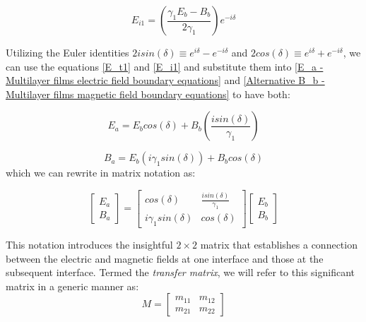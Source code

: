    \begin{equation} \label{E_i1}
    E_{i1} = \left(\frac{\gamma_1E_b - B_b}{2\gamma_1}\right)e^{-i\delta}
    \end{equation}

Utilizing the Euler identities $2isin(\delta) \equiv e^{i\delta} - e^{-i\delta}$ and $2cos(\delta) \equiv e^{i\delta} + e^{-i\delta}$, we can use the equations \ref{E_t1} and \ref{E_i1} and substitute them into \ref{E_a - Multilayer films electric field boundary equations} and \ref{Alternative B_b - Multilayer films magnetic field boundary equations} to have both:

    \begin{equation} \label{E_a in terms of E_b and B_b}
    E_a = E_bcos(\delta) + B_b\left(\frac{isin(\delta)}{\gamma_1}\right)
    \end{equation}
    
    \begin{equation} \label{B_a in terms of E_b and B_b}
    B_a = E_b(i\gamma_1sin(\delta)) + B_bcos(\delta)
    \end{equation}
which we can rewrite in matrix notation as:

    \[
      \begin{bmatrix}\label{Full form transfer matrix}
        E_a  \\
        B_a
      \end{bmatrix} = 
            \begin{bmatrix}
            cos(\delta) & \frac{isin(\delta)}{\gamma_1}    \\
            i\gamma_1sin(\delta) & cos(\delta)
            \end{bmatrix}
            \begin{bmatrix}
            E_b  \\
            B_b
          \end{bmatrix}
    \]

This notation introduces the insightful $2 \times 2$ matrix that establishes a connection between the electric and magnetic fields at one interface and those at the subsequent interface. Termed the \emph{transfer matrix}, we will refer to this significant matrix in a generic manner as: %
    \[
    M=
      \begin{bmatrix}
        m_{11} & m_{12}  \\
        m_{21} & m_{22}
      \end{bmatrix}
    \]

